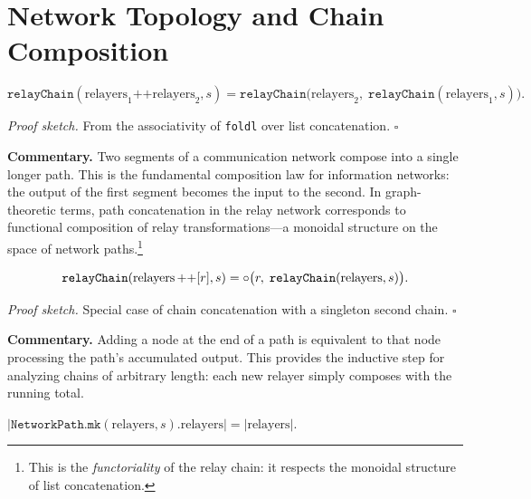 \section{Network Topology and Chain Composition}
\label{sec:ch18-topology}

\begin{theorem}
\label{thm:chain_concat}
\[
  \texttt{relayChain}(\text{relayers}_1 \mathop{++} \text{relayers}_2, s) =
  \texttt{relayChain}\bigl(\text{relayers}_2,\;
  \texttt{relayChain}(\text{relayers}_1, s)\bigr).
\]
\end{theorem}

\noindent\textit{Proof sketch.}\quad
From the associativity of \texttt{foldl} over list concatenation.
\hfill$\square$

\medskip

\noindent\textbf{Commentary.}
Two segments of a communication network compose into a single longer path.
This is the fundamental composition law for information networks: the output
of the first segment becomes the input to the second.  In graph-theoretic
terms, path concatenation in the relay network corresponds to functional
composition of relay transformations---a monoidal structure on the space
of network paths.\footnote{This is the \emph{functoriality} of the relay
chain: it respects the monoidal structure of list concatenation.}

\begin{theorem}
\label{thm:chain_append}
\[
  \texttt{relayChain}(\text{relayers} \mathop{++} [r], s) =
  \circ\bigl(r,\; \texttt{relayChain}(\text{relayers}, s)\bigr).
\]
\end{theorem}

\noindent\textit{Proof sketch.}\quad
Special case of chain concatenation with a singleton second chain.
\hfill$\square$

\medskip

\noindent\textbf{Commentary.}
Adding a node at the end of a path is equivalent to that node processing
the path's accumulated output.  This provides the inductive step for
analyzing chains of arbitrary length: each new relayer simply composes with
the running total.

\begin{theorem}
\label{thm:relay_preserves_relayer_count}
$|\texttt{NetworkPath.mk}(\text{relayers}, s).\text{relayers}| = |\text{relayers}|$.
\end{theorem}

